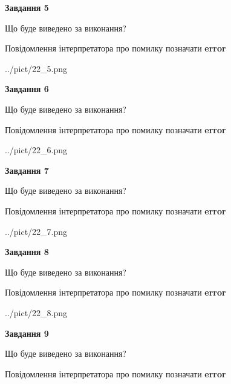 \documentclass[11pt, ukrainian]{article}
\begin{document}
{\begin {large}
{\begin {center}\textbf{Завдання 5}\end {center}}\par
Що буде виведено за виконання? \par
Повідомлення інтерпретатора про помилку позначати \textbf{error}

\begin{center}
	{../pict/22_5.png}
\end{center}
\newpage

{\begin {center}\textbf{Завдання 6}\end {center}}\par
Що буде виведено за виконання? \par
Повідомлення інтерпретатора про помилку позначати \textbf{error}

\begin{center}
	{../pict/22_6.png}
\end{center}
\newpage

{\begin {center}\textbf{Завдання 7}\end {center}}\par
Що буде виведено за виконання? \par
Повідомлення інтерпретатора про помилку позначати \textbf{error}

\begin{center}
	{../pict/22_7.png}
\end{center}
\newpage

{\begin {center}\textbf{Завдання 8}\end {center}}\par
Що буде виведено за виконання? \par
Повідомлення інтерпретатора про помилку позначати \textbf{error}

\begin{center}
	{../pict/22_8.png}
\end{center}
\newpage

{\begin {center}\textbf{Завдання 9}\end {center}}\par
Що буде виведено за виконання? \par
Повідомлення інтерпретатора про помилку позначати \textbf{error}


\end{large}}
\end{document}
